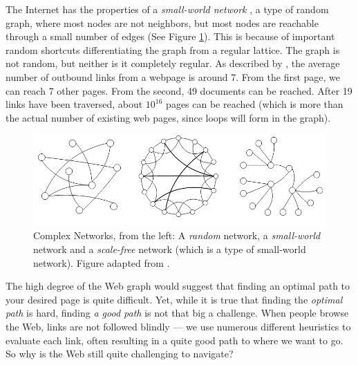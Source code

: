 The Internet has the properties of a \emph{small-world network} \citep{Newman2000}, 
a type of random graph, where most nodes are not neighbors, but most nodes are reachable through a small number of edges (See Figure \ref{fig:swn}). 
This is because of important random shortcuts differentiating the graph from a regular lattice. 
The graph is not  random, but neither is it completely regular.
As described by \citet[p37]{Barabasi2003}, the average number of outbound links from a webpage is around 7.
From the first page, we can reach 7 other pages. From the second, 49 documents can be reached. 
After 19 links have been traversed, about $10^{16}$ pages can be reached (which is more than the actual number of existing web pages, since loops will form in the graph).

\begin{figure}[t]
  \includegraphics[width=\textwidth]{../graphics/graphs}
  \caption[Complex Networks]{
    Complex Networks,
    from the left: A \emph{random} network, a \emph{small-world} network and a \emph{scale-free} network 
    (which is a type of  small-world network). Figure adapted from \cite{Huang2005}.} 
  \label{fig:swn}
\end{figure}

The high degree of the Web graph would suggest that finding an optimal path to your desired page is quite difficult. 
Yet, while it is true that finding the \emph{optimal path} is hard, finding \emph{a good path} is not that big a challenge. 
When people browse the Web, links are not followed blindly --- we use numerous different heuristics to evaluate each link, often resulting in a quite good path to where we want to go. 
So why is the Web still quite challenging to navigate?

